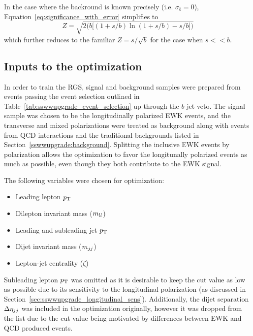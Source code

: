 In the case where the backround is known precisely (i.e. $\sigma_b = 0$), Equation~\ref{eq:significance_with_error} simplifies to
\begin{equation}
Z = \sqrt{2\bigg(b\big[(1+s/b)\ln(1+s/b)-s/b\big]\bigg)}
\label{eq:significance_without_error}
\end{equation}
which further reduces to the familiar $Z = s/\sqrt{b}$ for the case when $s << b$.

%
\subsection{Inputs to the optimization}\label{sswwupgrade:opt_inputs}
In order to train the RGS, signal and background samples were prepared from events passing the event selection outlined in Table~\ref{tab:sswwupgrade_event_selection} up through the $b$-jet veto.
The signal sample was chosen to be the longitudinally polarized \ssww EWK events, and the transverse and mixed polarizations were treated as background along with \ssww events from QCD interactions and the traditional backgrounds listed in Section~\ref{sswwupgrade:background}.
Splitting the inclusive \ssww EWK events by polarization allows the optimization to favor the longitunally polarized events as much as possible, even though they both contribute to the EWK signal.

The following variables were chosen for optimization:
\begin{itemize}
\item Leading lepton $p_{\mathrm{T}}$
\item Dilepton invariant mass ($m_{ll}$)
\item Leading and subleading jet $p_{\mathrm{T}}$
\item Dijet invariant mass ($m_{jj}$)
\item Lepton-jet centrality ($\zeta$)
\end{itemize}
Subleading lepton $p_{\mathrm{T}}$ was omitted as it is desirable to keep the cut value as low as possible due to its sensitivity to the longitudinal polarization (as discussed in Section~\ref{sec:sswwupgrade_longitudinal_sens}).
Additionally, the dijet separation $\detajj$ was included in the optimization originally, however it was dropped from the list due to the cut value being motivated by differences between EWK and QCD produced \ssww events.

